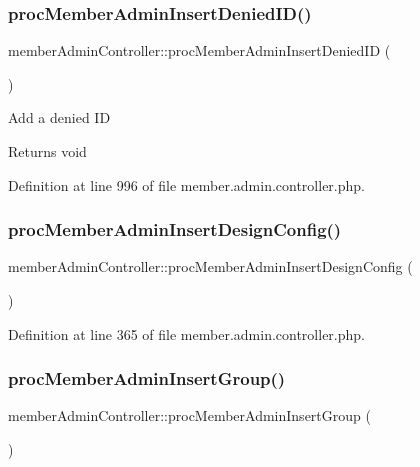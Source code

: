 \subsubsection{\texorpdfstring{proc\+Member\+Admin\+Insert\+Denied\+I\+D()}{procMemberAdminInsertDeniedID()}}
{\footnotesize\ttfamily member\+Admin\+Controller\+::proc\+Member\+Admin\+Insert\+Denied\+ID (\begin{DoxyParamCaption}{ }\end{DoxyParamCaption})}

Add a denied ID \begin{DoxyReturn}{Returns}
void 
\end{DoxyReturn}


Definition at line 996 of file member.\+admin.\+controller.\+php.

\hypertarget{classmemberAdminController_a95ca46d0090220adba228592e8e09aa5}{}\label{classmemberAdminController_a95ca46d0090220adba228592e8e09aa5} 
\subsubsection{\texorpdfstring{proc\+Member\+Admin\+Insert\+Design\+Config()}{procMemberAdminInsertDesignConfig()}}
{\footnotesize\ttfamily member\+Admin\+Controller\+::proc\+Member\+Admin\+Insert\+Design\+Config (\begin{DoxyParamCaption}{ }\end{DoxyParamCaption})}



Definition at line 365 of file member.\+admin.\+controller.\+php.

\hypertarget{classmemberAdminController_a3ae8c66d424cd909998fbcd9f257c809}{}\label{classmemberAdminController_a3ae8c66d424cd909998fbcd9f257c809} 
\subsubsection{\texorpdfstring{proc\+Member\+Admin\+Insert\+Group()}{procMemberAdminInsertGroup()}}
{\footnotesize\ttfamily member\+Admin\+Controller\+::proc\+Member\+Admin\+Insert\+Group (\begin{DoxyParamCaption}{ }\end{DoxyParamCaption})}

